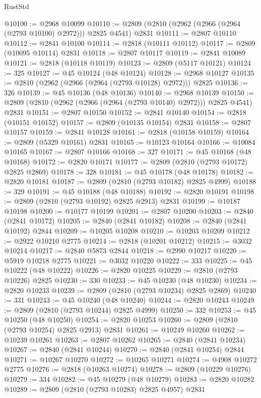 \begin{lexlean}{RustStd}
\begin{coremodule}
@10100 := @2968 @10099
@10110 := @2809 (@2810 (@2962 (@2966 (@2964 (@2793 @10100) @2972))) @2825 @4541) @2831
@10111 := @2807 @10110
@10112 := @2841 @10100
@10114 := @2818 (@10111 @10112)
@10117 := @2809 (@10095 @10114) @2831
@10118 := @2807 @10117
@10119 := @2841 @10089
@10121 := @2818 (@10118 @10119)
@10123 := @2809 (@5117 @10121)
@10124 := 325
@10127 := @45 @10124 (@48 @10124)
@10128 := @2968 @10127
@10135 := @2810 (@2962 (@2966 (@2964 (@2793 @10128) @2972))) @2825
@10136 := 326
@10139 := @45 @10136 (@48 @10136)
@10140 := @2968 @10139
@10150 := @2809 (@2810 (@2962 (@2966 (@2964 (@2793 @10140) @2972))) @2825 @4541) @2831
@10151 := @2807 @10150
@10152 := @2841 @10140
@10154 := @2818 (@10151 @10152)
@10157 := @2809 (@10135 @10154) @2831
@10158 := @2807 @10157
@10159 := @2841 @10128
@10161 := @2818 (@10158 @10159)
@10164 := @2809 (@5329 @10161) @2831
@10165 := @10123 @10164
@10166 := @10084 @10165
@10167 := @2807 @10166
@10168 := 327
@10171 := @45 @10168 (@48 @10168)
@10172 := @2820 @10171
@10177 := @2809 (@2810 (@2793 @10172) @2825 @2869)
@10178 := 328
@10181 := @45 @10178 (@48 @10178)
@10182 := @2820 @10181
@10187 := @2809 (@2810 (@2793 @10182) @2825 @4999)
@10188 := 329
@10191 := @45 @10188 (@48 @10188)
@10192 := @2820 @10191
@10198 := @2809 (@2810 (@2793 @10192) @2825 @2913) @2831
@10199 := @10187 @10198
@10200 := @10177 @10199
@10201 := @2807 @10200
@10203 := @2840 (@2841 @10172)
@10205 := @2840 (@2841 @10182)
@10208 := @2840 (@2841 @10192) @2844
@10209 := @10205 @10208
@10210 := @10203 @10209
@10212 := @2922 @10210 @2775
@10214 := @2818 (@10201 @10212)
@10215 := @3032 @10214
@10217 := @2840 @5873 @2844
@10218 := @2990 @10217
@10220 := @5919 @10218 @2775
@10221 := @3032 @10220
@10222 := 333
@10225 := @45 @10222 (@48 @10222)
@10226 := @2820 @10225
@10229 := @2810 (@2793 @10226) @2825
@10230 := 330
@10233 := @45 @10230 (@48 @10230)
@10234 := @2820 @10233
@10239 := @2809 (@2810 (@2793 @10234) @2825 @2869)
@10240 := 331
@10243 := @45 @10240 (@48 @10240)
@10244 := @2820 @10243
@10249 := @2809 (@2810 (@2793 @10244) @2825 @4999)
@10250 := 332
@10253 := @45 @10250 (@48 @10250)
@10254 := @2820 @10253
@10260 := @2809 (@2810 (@2793 @10254) @2825 @2913) @2831
@10261 := @10249 @10260
@10262 := @10239 @10261
@10263 := @2807 @10262
@10265 := @2840 (@2841 @10234)
@10267 := @2840 (@2841 @10244)
@10270 := @2840 (@2841 @10254) @2844
@10271 := @10267 @10270
@10272 := @10265 @10271
@10274 := @4908 @10272 @2775
@10276 := @2818 (@10263 @10274)
@10278 := @2809 (@10229 @10276)
@10279 := 334
@10282 := @45 @10279 (@48 @10279)
@10283 := @2820 @10282
@10289 := @2809 (@2810 (@2793 @10283) @2825 @4957) @2831

\end{coremodule}
\end{lexlean}
